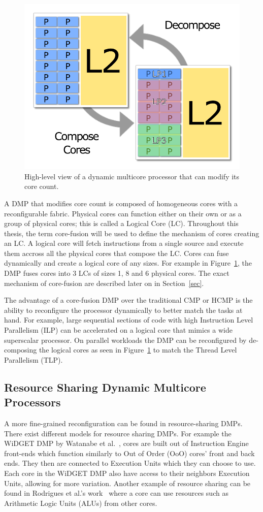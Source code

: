 \begin{figure}[t]
    \centering
    \includegraphics[width=.7\textwidth]{streamit-paper/graphics/dmcgraph.pdf}
    \caption{High-level view of a dynamic multicore processor that can modify its core count.}
    \label{fig:dynmulticore}
\end{figure}

A DMP that modifies core count is composed of homogeneous cores with a reconfigurable fabric.
Physical cores can function either on their own or as a group of physical cores; this is called a Logical Core (LC).
Throughout this thesis, the term core-fusion will be used to define the mechanism of cores creating an LC.
A logical core will fetch instructions from a single source and execute them accross all the physical cores that compose the LC.
Cores can fuse dynamically and create a logical core of any sizes.
For example in Figure~\ref{fig:dynmulticore}, the DMP fuses cores into 3 LCs of sizes 1, 8 and 6 physical cores.
The exact mechanism of core-fusion are described later on in Section~\ref{sec}.

The advantage of a core-fusion DMP over the traditional CMP or HCMP is the ability to reconfigure the processor dynamically to better match the tasks at hand.
For example, large sequential sections of code with high Instruction Level Parallelism (ILP) can be accelerated on a logical core that mimics a wide superscalar processor.
On parallel workloads the DMP can be reconfigured by de-composing the logical cores as seen in Figure~\ref{fig:dynmulticore} to match the Thread Level Parallelism (TLP).

\subsection{Resource Sharing Dynamic Multicore Processors}
A more fine-grained reconfiguration can be found in resource-sharing DMPs.
There exist different models for resource sharing DMPs.
For example the WiDGET DMP by Watanabe et al.~\cite{watanabe}, cores are built out of Instruction Engine front-ends which function similarly to Out of Order (OoO) cores' front and back ends.
They then are connected to Execution Units which they can choose to use.
Each core in the WiDGET DMP also have access to their neighbors Execution Units, allowing for more variation.
Another example of resource sharing can be found in Rodrigues et al.'s work~\cite{} where a core can use resources such as Arithmetic Logic Units (ALUs) from other cores.

